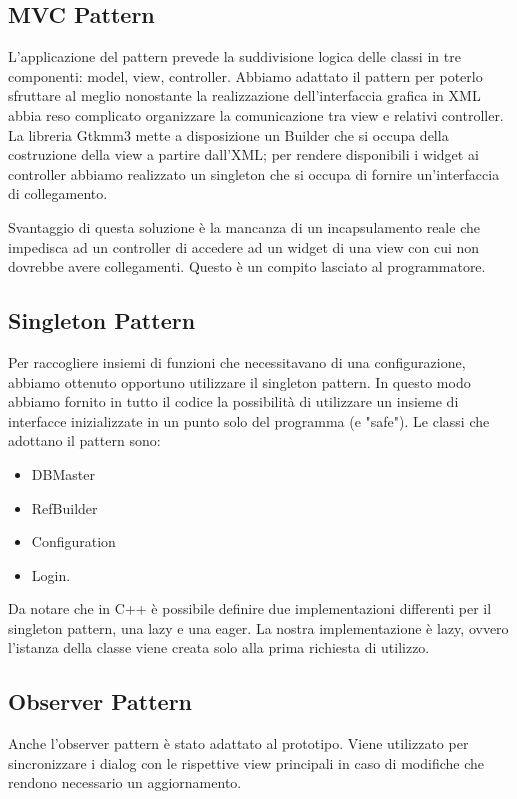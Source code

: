 \documentclass[a4paper, 11pt]{article}
\newcommand{\safeImage} [2] [\textwidth]{%
	\begin{figure}[H]
		\centering
	\IfFileExists{#2}{\texttt{[image: \#2]}}{\texttt{[image: example-image-a]}}
	\end{figure}
}
\begin{document}
\subsection{MVC Pattern}
L'applicazione del pattern prevede la suddivisione logica delle classi in tre componenti: model, view, controller. 
Abbiamo adattato il pattern per poterlo sfruttare al meglio nonostante la realizzazione dell'interfaccia grafica in XML abbia reso complicato organizzare la comunicazione tra view e relativi controller.
La libreria Gtkmm3 mette a disposizione un Builder che si occupa della costruzione della view a partire dall'XML; per rendere disponibili i widget ai controller abbiamo realizzato un singleton che si occupa di fornire un'interfaccia di collegamento.

Svantaggio di questa soluzione è la mancanza di un incapsulamento reale che impedisca ad un controller di accedere ad un widget di una view con cui non dovrebbe avere collegamenti. Questo è un compito lasciato al programmatore.

\safeImage[0.7\textwidth]{mvc.png}

\subsection{Singleton Pattern}
Per raccogliere insiemi di funzioni che necessitavano di una configurazione, abbiamo ottenuto opportuno utilizzare il singleton pattern. In questo modo abbiamo fornito in tutto il codice la possibilità di utilizzare un insieme di interfacce inizializzate in un punto solo del programma (e "safe").
Le classi che adottano il pattern sono: 

\begin{itemize}[nosep]
	\item DBMaster
	\item RefBuilder
	\item Configuration
	\item Login.
\end{itemize}

Da notare che in C++ è possibile definire due implementazioni differenti per il singleton pattern, una lazy e una eager. La nostra implementazione è lazy, ovvero l'istanza della classe viene creata solo alla prima richiesta di utilizzo.

\subsection{Observer Pattern}
Anche l'observer pattern è stato adattato al prototipo. Viene utilizzato per sincronizzare i dialog con le rispettive view principali in caso di modifiche che rendono necessario un aggiornamento. 
\end{document}
